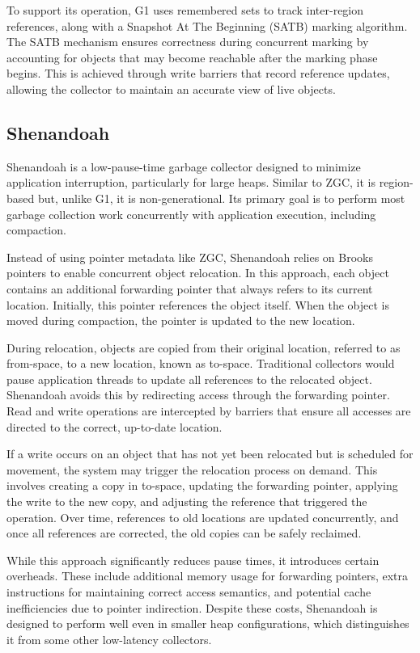 To support its operation, G1 uses remembered sets to track inter-region references, along with a Snapshot At The Beginning (SATB) marking algorithm. The SATB mechanism ensures correctness during concurrent marking by accounting for objects that may become reachable after the marking phase begins. This is achieved through write barriers that record reference updates, allowing the collector to maintain an accurate view of live objects.

\subsection{Shenandoah}

Shenandoah is a low-pause-time garbage collector designed to minimize application interruption, particularly for large heaps. Similar to ZGC, it is region-based but, unlike G1, it is non-generational. Its primary goal is to perform most garbage collection work concurrently with application execution, including compaction.

Instead of using pointer metadata like ZGC, Shenandoah relies on Brooks pointers to enable concurrent object relocation. In this approach, each object contains an additional forwarding pointer that always refers to its current location. Initially, this pointer references the object itself. When the object is moved during compaction, the pointer is updated to the new location.

During relocation, objects are copied from their original location, referred to as from-space, to a new location, known as to-space. Traditional collectors would pause application threads to update all references to the relocated object. Shenandoah avoids this by redirecting access through the forwarding pointer. Read and write operations are intercepted by barriers that ensure all accesses are directed to the correct, up-to-date location.

If a write occurs on an object that has not yet been relocated but is scheduled for movement, the system may trigger the relocation process on demand. This involves creating a copy in to-space, updating the forwarding pointer, applying the write to the new copy, and adjusting the reference that triggered the operation. Over time, references to old locations are updated concurrently, and once all references are corrected, the old copies can be safely reclaimed.

While this approach significantly reduces pause times, it introduces certain overheads. These include additional memory usage for forwarding pointers, extra instructions for maintaining correct access semantics, and potential cache inefficiencies due to pointer indirection. Despite these costs, Shenandoah is designed to perform well even in smaller heap configurations, which distinguishes it from some other low-latency collectors.

